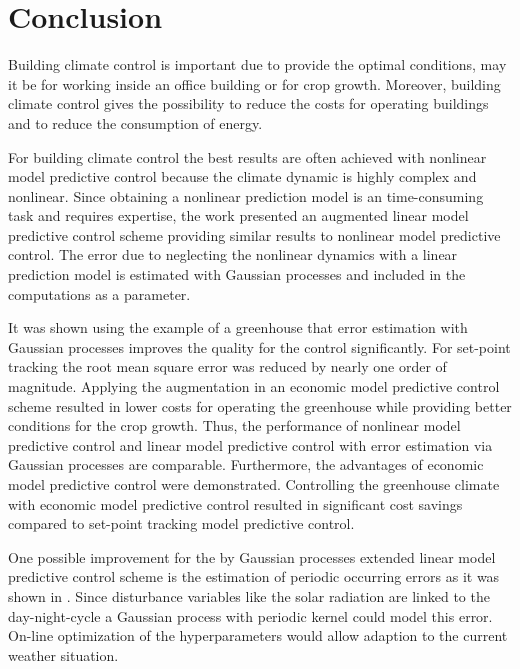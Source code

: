 \chapter{Conclusion}
\label{cha:conclusion}

Building climate control is important due to provide the optimal conditions, may it be for working inside an office building or for crop growth.
Moreover, building climate control gives the possibility to reduce the costs for operating buildings and to reduce the consumption of energy.

For building climate control the best results are often achieved with nonlinear model predictive control because the climate dynamic is highly complex and nonlinear.
Since obtaining a nonlinear prediction model is an time-consuming task and requires expertise, the work presented an augmented linear model predictive control scheme providing similar results to nonlinear model predictive control.
The error due to neglecting the nonlinear dynamics with a linear prediction model is estimated with Gaussian processes and included in the computations as a parameter.\par\medskip

It was shown using the example of a greenhouse that error estimation with Gaussian processes improves the quality for the control significantly.
For set-point tracking the root mean square error was reduced by nearly one order of magnitude.
Applying the augmentation in an economic model predictive control scheme resulted in lower costs for operating the greenhouse while providing better conditions for the crop growth.
Thus, the performance of nonlinear model predictive control and linear model predictive control with error estimation via Gaussian processes are comparable.
Furthermore, the advantages of economic model predictive control were demonstrated.
Controlling the greenhouse climate with economic model predictive control resulted in significant cost savings compared to set-point tracking model predictive control.\par\medskip

One possible improvement for the by Gaussian processes extended linear model predictive control scheme is the estimation of periodic occurring errors as it was shown in \cite{Klenske.2016}.
Since disturbance variables like the solar radiation are linked to the day-night-cycle a Gaussian process with periodic kernel could model this error.
On-line optimization of the hyperparameters would allow adaption to the current weather situation.

